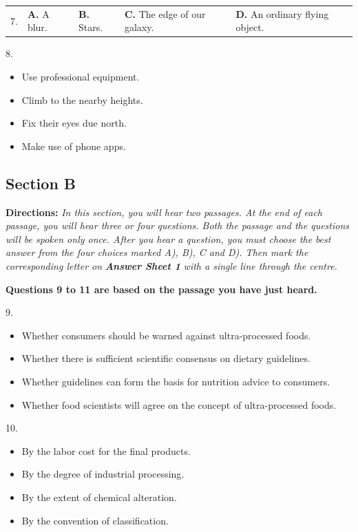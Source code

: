 \documentclass[UTF8,11pt]{ctexart}
\begin{document}
\noindent\begin{tabularx}{\linewidth}{@{}lXXXX@{}}7. & \textbf{A.} A blur. & \textbf{B.} Stars. & \textbf{C.} The edge of our galaxy. & \textbf{D.} An ordinary flying object.\\\end{tabularx}\par

8.


\begin{itemize}[leftmargin=2em,itemsep=.2em,topsep=.4em]\item[A.] Use professional equipment.
\item[B.] Climb to the nearby heights.
\item[C.] Fix their eyes due north.
\item[D.] Make use of phone apps.
\end{itemize}

\subsection*{\textbf{Section B}}


\textbf{Directions:} \textit{In this section, you will hear two passages. At the end of each passage, you will hear three or four} \textit{questions. Both the passage and the questions will be spoken only once. After you hear a question, you must choose the} \textit{best answer from the four choices marked A), B), C and D). Then mark the corresponding letter on }\textbf{\textit{Answer Sheet 1}} \textit{with a single line through the centre.}


\textbf{Questions 9 to 11 are based on the passage you have just heard.}


9.


\begin{itemize}[leftmargin=2em,itemsep=.2em,topsep=.4em]\item[A.] Whether consumers should be warned against ultra-processed foods.
\item[B.] Whether there is sufficient scientific consensus on dietary guidelines.
\item[C.] Whether guidelines can form the basis for nutrition advice to consumers.
\item[D.] Whether food scientists will agree on the concept of ultra-processed foods.
\end{itemize}

10.


\begin{itemize}[leftmargin=2em,itemsep=.2em,topsep=.4em]\item[A.] By the labor cost for the final products.
\item[B.] By the degree of industrial processing.
\item[C.] By the extent of chemical alteration.
\item[D.] By the convention of classification.
\end{itemize}
\end{document}
